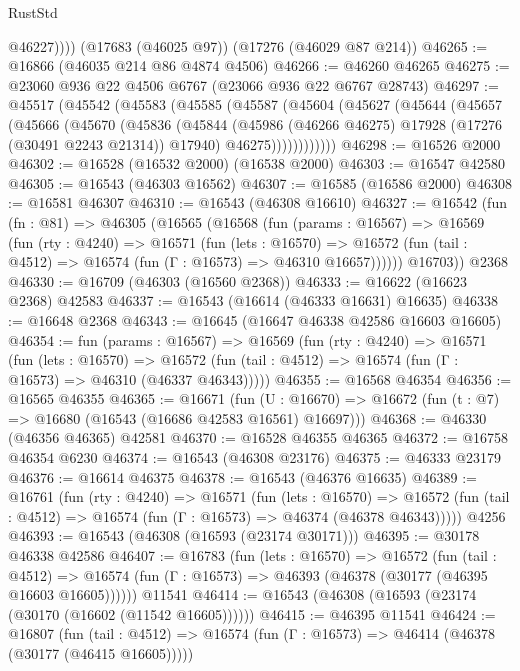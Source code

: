 \begin{lexlean}{RustStd}
\begin{coremodule}
            @46227))))
    (@17683 (@46025 @97))
    (@17276 (@46029 @87 @214))
@46265 := @16866 (@46035 @214 @86 @4874 @4506)
@46266 := @46260 @46265
@46275 := @23060 @936 @22 @4506 @6767 (@23066 @936 @22 @6767 @28743)
@46297 := @45517
    (@45542
      (@45583
        (@45585
          (@45587
            (@45604
              (@45627
                (@45644
                  (@45657
                    (@45666
                      (@45670
                        (@45836
                          (@45844
                            (@45986 (@46266 @46275) @17928 (@17276 (@30491 @2243 @21314)) @17940)
                            @46275))))))))))))
@46298 := @16526 @2000
@46302 := @16528 (@16532 @2000) (@16538 @2000)
@46303 := @16547 @42580
@46305 := @16543 (@46303 @16562)
@46307 := @16585 (@16586 @2000)
@46308 := @16581 @46307
@46310 := @16543 (@46308 @16610)
@46327 := @16542
    (fun (fn : @81) =>
    @46305
      (@16565
        (@16568
          (fun (params : @16567) =>
          @16569
            (fun (rty : @4240) =>
            @16571
              (fun (lets : @16570) =>
              @16572 (fun (tail : @4512) => @16574 (fun (Γ : @16573) => @46310 @16657))))))
        @16703))
    @2368
@46330 := @16709 (@46303 (@16560 @2368))
@46333 := @16622 (@16623 @2368) @42583
@46337 := @16543 (@16614 (@46333 @16631) @16635)
@46338 := @16648 @2368
@46343 := @16645 (@16647 @46338 @42586 @16603 @16605)
@46354 := fun (params : @16567) =>
  @16569
    (fun (rty : @4240) =>
    @16571
      (fun (lets : @16570) =>
      @16572 (fun (tail : @4512) => @16574 (fun (Γ : @16573) => @46310 (@46337 @46343)))))
@46355 := @16568 @46354
@46356 := @16565 @46355
@46365 := @16671
    (fun (U : @16670) => @16672 (fun (t : @7) => @16680 (@16543 (@16686 @42583 @16561) @16697)))
@46368 := @46330 (@46356 @46365) @42581
@46370 := @16528 @46355 @46365
@46372 := @16758 @46354 @6230
@46374 := @16543 (@46308 @23176)
@46375 := @46333 @23179
@46376 := @16614 @46375
@46378 := @16543 (@46376 @16635)
@46389 := @16761
    (fun (rty : @4240) =>
    @16571
      (fun (lets : @16570) =>
      @16572 (fun (tail : @4512) => @16574 (fun (Γ : @16573) => @46374 (@46378 @46343)))))
    @4256
@46393 := @16543 (@46308 (@16593 (@23174 @30171)))
@46395 := @30178 @46338 @42586
@46407 := @16783
    (fun (lets : @16570) =>
    @16572
      (fun (tail : @4512) =>
      @16574 (fun (Γ : @16573) => @46393 (@46378 (@30177 (@46395 @16603 @16605))))))
    @11541
@46414 := @16543 (@46308 (@16593 (@23174 (@30170 (@16602 (@11542 @16605))))))
@46415 := @46395 @11541
@46424 := @16807
    (fun (tail : @4512) => @16574 (fun (Γ : @16573) => @46414 (@46378 (@30177 (@46415 @16605)))))

\end{coremodule}
\end{lexlean}
